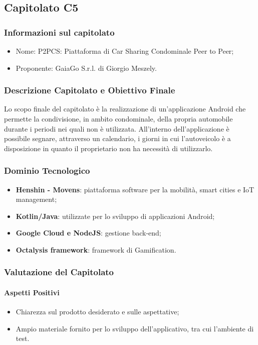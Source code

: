 \subsection{Capitolato C5}

\subsubsection{Informazioni sul capitolato}
\begin{itemize}
  \item{Nome}: P2PCS: Piattaforma di Car Sharing Condominale Peer to Peer;
  \item{Proponente}: GaiaGo S.r.l. di Giorgio Meszely.
\end{itemize}

\subsubsection{Descrizione Capitolato e Obiettivo Finale}
Lo scopo finale del capitolato è la realizzazione di un'applicazione Android che permette la condivisione, in ambito condominale, della propria automobile durante i periodi nei quali non è utilizzata.
All'interno dell'applicazione è possibile segnare, attraverso un calendario, i giorni in cui l'autoveicolo è a disposizione in quanto il proprietario non ha necessità di utilizzarlo.

\subsubsection{Dominio Tecnologico}
\begin{itemize}
  \item \textbf{Henshin - Movens}: piattaforma software per la mobilità, smart cities e IoT management;
  \item \textbf{Kotlin/Java}: utilizzate per lo sviluppo di applicazioni Android;
  \item \textbf{Google Cloud e NodeJS}: gestione back-end;
  \item \textbf{Octalysis framework}: framework di Gamification\glossario.
\end{itemize}

\subsubsection{Valutazione del Capitolato}
\paragraph{Aspetti Positivi}
  \begin{itemize}
    \item Chiarezza sul prodotto desiderato e sulle aspettative;
    \item Ampio materiale fornito per lo sviluppo dell'applicativo, tra cui l'ambiente di test.
  \end{itemize}

